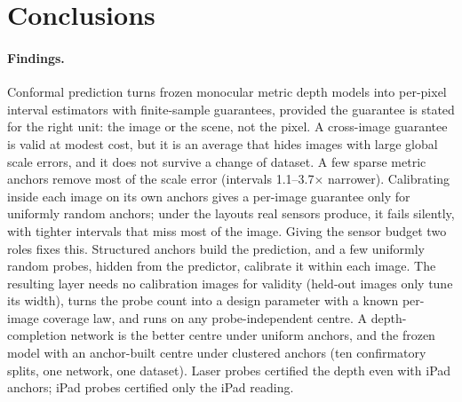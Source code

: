 \section{Conclusions}
\label{sec:conclusions}

\paragraph{Findings.}
Conformal prediction turns frozen monocular metric depth models into per-pixel interval estimators with finite-sample guarantees, provided the guarantee is stated for the right unit: the image or the scene, not the pixel.
A cross-image guarantee is valid at modest cost, but it is an average that hides images with large global scale errors, and it does not survive a change of dataset.
A few sparse metric anchors remove most of the scale error (intervals 1.1--3.7$\times$ narrower).
Calibrating inside each image on its own anchors gives a per-image guarantee only for uniformly random anchors; under the layouts real sensors produce, it fails silently, with tighter intervals that miss most of the image.
Giving the sensor budget two roles fixes this.
Structured anchors build the prediction, and a few uniformly random probes, hidden from the predictor, calibrate it within each image.
The resulting layer needs no calibration images for validity (held-out images only tune its width), turns the probe count into a design parameter with a known per-image coverage law, and runs on any probe-independent centre.
A depth-completion network is the better centre under uniform anchors, and the frozen model with an anchor-built centre under clustered anchors (ten confirmatory splits, one network, one dataset).
Laser probes certified the depth even with iPad anchors; iPad probes certified only the iPad reading.


